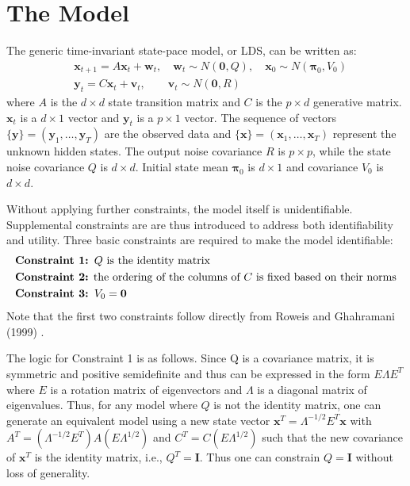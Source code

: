 \documentclass[fleqn]{article}
\newcommand{\T}{T}
\begin{document}
\section{The Model}
The generic time-invariant state-pace model, or LDS, can be written as:
\begin{equation} \label{eq:model}
\begin{aligned}
&\mathbf{x}_{t+1}=A\mathbf{x}_t+\mathbf{w}_t, \quad \mathbf{w}_t\sim N(\mathbf{0},Q),\quad \mathbf{x}_0 \sim N(\mathbf{\pi}_0,V_0)\\
&\mathbf{y}_t=C\mathbf{x}_t+\mathbf{v}_t,\qquad \mathbf{v}_t\sim N(\mathbf{0},R)
\end{aligned}
\end{equation}
where $A$ is the $d\times d$ state transition matrix and $C$ is the $p \times d$ generative matrix. $\mathbf{x}_t$ is a $d\times 1$ vector and $\mathbf{y}_t$ is a $p\times 1$ vector. The sequence of vectors $\{\mathbf{y}\}=(\mathbf{y}_1,\ldots,\mathbf{y}_T)$ are the observed data and $\{\mathbf{x}\}=(\mathbf{x}_1,\ldots,\mathbf{x}_T)$ represent the unknown hidden states. The output noise covariance $R$ is $p\times p$, while the state noise covariance $Q$ is $d\times d$. Initial state mean $\mathbf{\pi}_0$ is $d\times 1$ and covariance $V_0$ is $d \times d$.

Without applying further constraints, the model itself is unidentifiable. Supplemental constraints are are thus introduced to address both identifiability and utility. Three basic constraints are required to make the model identifiable:
\vspace*{-3mm}
\begin{equation*}\label{eq:constraints1}
\begin{aligned}
&\textbf{Constraint 1: }Q \text{ is the identity matrix}\\
&\text{\textbf{Constraint 2:} the ordering of the columns of } C \text{ is fixed based on their norms}\\
&\textbf{Constraint 3: } V_0=\mathbf{0}
\end{aligned}
\end{equation*}
Note that the first two constraints follow directly from Roweis and Ghahramani (1999) \cite{roweis1999unifying}.

The logic for Constraint 1 is as follows. Since Q is a covariance matrix, it is symmetric and positive semidefinite and thus can be expressed in the form $E\Lambda E^T$ where $E$ is a rotation matrix of eigenvectors and $\Lambda$ is a diagonal matrix of eigenvalues. Thus, for any model where $Q$ is not the identity matrix, one can generate an equivalent model using a new state vector $\mathbf{x}^{\T}=\Lambda^{-1/2} E^T \mathbf{x}$ with $A^{\T}=(\Lambda^{-1/2}E^T)A(E\Lambda^{1/2})$ and $C^{\T}=C(E\Lambda^{1/2})$ such that the new covariance of $\mathbf{x}^{\T}$ is the identity matrix, i.e., $Q^{\T}=\mathbf{I}$. Thus one can constrain $Q=\mathbf{I}$ without loss of generality.
\end{document}
